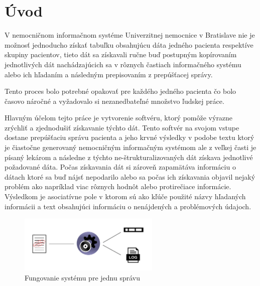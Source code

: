 \chapter*{Úvod} %

V nemocničnom informačnom systéme Univerzitnej nemocnice v Bratislave nie je možnosť jednoducho získať tabuľku obsahujúcu dáta jedného pacienta respektíve skupiny pacientov, tieto dát sa získavali ručne buď postupným kopírovaním jednotlivých dát nachádzajúcich sa v rôznych častiach informačného systému alebo ich hľadaním a následným prepisovaním z prepúšťacej správy.

Tento proces bolo potrebné opakovať pre každého jedného pacienta čo bolo časovo náročné a vyžadovalo si nezanedbateľné množstvo ľudskej práce.

Hlavným účelom tejto práce je vytvorenie softvéru, ktorý pomôže výrazne zrýchliť a zjednodušiť získavanie týchto dát. Tento softvér na svojom vstupe dostane prepúšťaciu správu pacienta a jeho krvné výsledky v podobe textu ktorý je čiastočne generovaný nemocničným informačným systémom ale z veľkej časti je písaný lekárom a následne z týchto ne-štrukturalizovaných dát získava jednotlivé požadované dáta. Počas získavania dát si zároveň zapamätáva informáciu o dátach ktoré sa buď nájsť nepodarilo alebo sa počas ich získavania objavil nejaký problém ako napríklad viac rôznych hodnôt alebo protirečiace informácie. Výsledkom je asociatívne pole v ktorom sú ako kľúče použité názvy hľadaných informácii a text obsahujúci informáciu o nenájdených a problémových údajoch. 

\begin{figure}
	\centerline{\includegraphics[width=0.6\textwidth]{images/system_jedna_sprava}}
	\caption[Fungovanie systému pre jednu správu]{Fungovanie systému pre jednu správu}
	\label{obr:systemJedna}
\end{figure}
  
